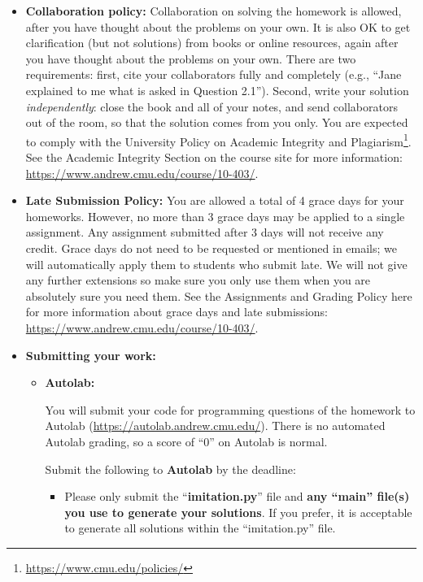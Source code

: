 \documentclass[12pt]{article}
\begin{document}
\begin{itemize}
\item \textbf{Collaboration policy:} Collaboration on solving the homework is allowed, after you have thought about the problems on your own. It is also OK to get clarification (but not solutions) from books or online resources, again after you have thought about the problems on your own. There are two requirements: first, cite your collaborators fully and completely (e.g., ``Jane explained to me what is asked in Question 2.1''). Second, write your solution {\em independently}: close the book and all of your notes, and send collaborators out of the room, so that the solution comes from you only.  You are expected to comply with the University Policy on Academic Integrity and Plagiarism\footnote{\url{https://www.cmu.edu/policies/}}.  See the Academic Integrity Section on the course site for more information: \url{https://www.andrew.cmu.edu/course/10-403/}.

\item\textbf{Late Submission Policy:} You are allowed a total of 4 grace days for your homeworks. However, no more than 3 grace days may be applied to a single assignment. Any assignment submitted after 3 days will not receive any credit.  Grace days do not need to be requested or mentioned in emails; we will automatically apply them to students who submit late. We will not give any further extensions so make sure you only use them when you are absolutely sure you need them.  See the Assignments and Grading Policy here for more information about grace days and late submissions: \url{https://www.andrew.cmu.edu/course/10-403/}.

\item\textbf{Submitting your work:} 

\begin{itemize}

\item \textbf{Autolab:} 

You will submit your code for programming questions of the homework to Autolab (\url{https://autolab.andrew.cmu.edu/}). There is no automated Autolab grading, so a score of ``0'' on Autolab is normal.

\noindent Submit the following to \textbf{Autolab} by the deadline:
\begin{itemize}
\item Please only submit the ``\textbf{imitation.py}'' file and \textbf{any ``main'' file(s) you use to generate your solutions}. If you prefer, it is acceptable to generate all solutions within the ``imitation.py'' file.
\end{itemize}


\end{itemize}
\end{itemize}
\end{document}
